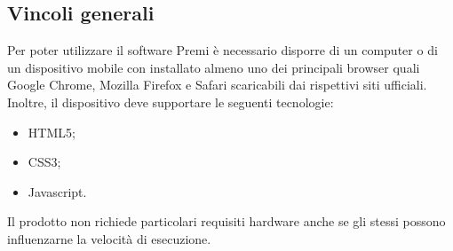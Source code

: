 {\subsection{Vincoli generali}{
	Per poter utilizzare il software Premi è necessario disporre di un computer o di un dispositivo mobile con installato almeno uno dei principali browser quali Google Chrome, Mozilla Firefox e Safari scaricabili dai rispettivi siti ufficiali. Inoltre, il dispositivo deve supportare le seguenti tecnologie:
	\begin{itemize}
		\item HTML5;
		\item CSS3;
		\item Javascript.
	\end{itemize}
	Il prodotto non richiede particolari requisiti hardware anche se gli stessi possono influenzarne la velocità di esecuzione.
	}
}